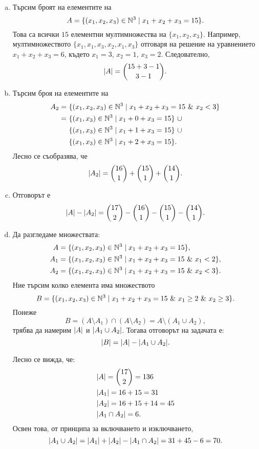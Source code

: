 \begin{solution}
  \begin{enumerate}[a)]
  \item
    Търсим броят на елементите на 
    \[A = \{(x_1,x_2,x_3) \in \mathbb{N}^3\mid x_1 + x_2 + x_3 = 15\}.\]
    Това са всички $15$ елементни мултимножества на  $\{x_1,x_2,x_3\}$.
    Например, мултимножеството $\{x_1,x_1,x_3,x_2,x_1,x_3\}$ отговаря на решение на уравнението $x_1 + x_2 + x_3 = 6$,
    където $x_1 = 3$, $x_2 = 1$, $x_3 = 2$.
    Следователно,
    \[\lvert{A}\rvert = \binom{15 + 3 - 1}{3-1}.\]
  \item
    Търсим броя на елементите на 
    \begin{align*}
      A_2 =\ &\{(x_1,x_2,x_3) \in \Nat^3\mid x_1 + x_2 + x_3 = 15\ \&\ x_2 < 3\}\\
      =\ & \{(x_1,x_3) \in \Nat^3\mid x_1 + 0 + x_3 = 15\}\ \cup \\ 
         & \{(x_1,x_3) \in \Nat^3\mid x_1 + 1 + x_3 = 15\}\ \cup \\ 
         & \{(x_1,x_3) \in \Nat^3\mid x_1 + 2 + x_3 = 15\}.
    \end{align*}
    Лесно се съобразява, че
    \[\lvert{A_2}\rvert = \binom{16}{1} + \binom{15}{1} + \binom{14}{1}.\]
  \item
    Отговорът е
    \[\lvert{A}\rvert - \lvert{A_2}\rvert = \binom{17}{2} - \binom{16}{1} - \binom{15}{1} - \binom{14}{1}.\]
  \item
    Да разгледаме множествата:
    \begin{align*}
      A & = \{(x_1,x_2,x_3) \in \Nat^3\mid x_1 + x_2 + x_3 = 15\},\\
      A_1 & = \{(x_1,x_2,x_3) \in \Nat^3\mid x_1 + x_2 + x_3 = 15\ \&\ x_1 < 2\},\\
      A_2 & = \{(x_1,x_2,x_3) \in \Nat^3\mid x_1 + x_2 + x_3 = 15\ \&\ x_2 < 3\}.
    \end{align*}
    Ние търсим колко елемента има множеството 
    \[B = \{(x_1,x_2,x_3) \in \mathbb{N}^3\mid x_1 + x_2 + x_3 = 15\ \&\ x_1 \geq 2\ \&\ x_2 \geq 3\}.\]
    Понеже \[B = (A\setminus A_1) \cap (A\setminus A_2) = A \setminus (A_1 \cup A_2),\]
    трябва да намерим $\lvert{A}\rvert$ и $\lvert{A_1 \cup A_2}\rvert$. Тогава отговорът на задачата е:
    \[\lvert{B}\rvert = \lvert{A}\rvert - \lvert{A_1 \cup A_2}\rvert.\]

    Лесно се вижда, че:
    \begin{align*}
      & \lvert{A}\rvert  = \binom{17}{2} = 136\\
      & \lvert{A_1}\rvert = 16 + 15 = 31\\
      & \lvert{A_2}\rvert = 16 + 15 + 14 = 45\\
      & \lvert{A_1\cap A_2}\rvert = 6.
    \end{align*}
    Освен това, от принципа за включването и изключването, 
    \[\lvert{A_1 \cup A_2}\rvert = \lvert{A_1}\rvert + \lvert{A_2}\rvert - \lvert{A_1\cap A_2}\rvert = 31 + 45 - 6 = 70.\]


\end{enumerate}
\end{solution}
